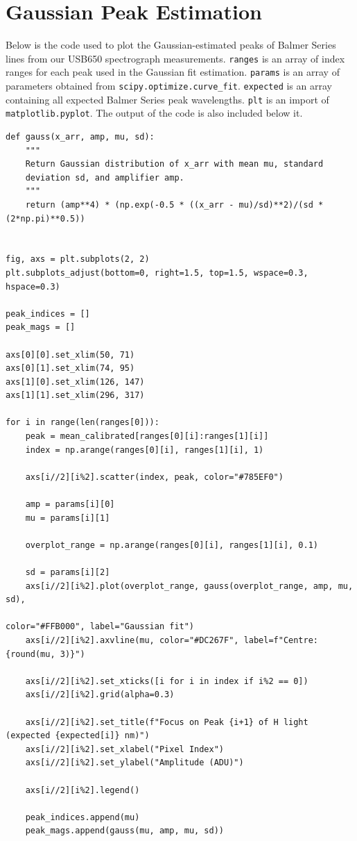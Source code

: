\documentclass[twocolumn]{aastex702}
\begin{document}
	\newpage
  \appendix
 		\section{Gaussian Peak Estimation}\label{code:gauss}
 		
 		Below is the code used to plot the Gaussian-estimated peaks of Balmer Series lines from our USB650 spectrograph measurements. \texttt{ranges} is an array of index ranges for each peak used in the Gaussian fit estimation. \texttt{params} is an array of parameters obtained from \texttt{scipy.optimize.curve\_fit}. \texttt{expected} is an array containing all expected Balmer Series peak wavelengths. \texttt{plt} is an import of \texttt{matplotlib.pyplot}. The output of the code is also included below it.
 		
	 		\begin{verbatim}
def gauss(x_arr, amp, mu, sd):
    """
    Return Gaussian distribution of x_arr with mean mu, standard 
    deviation sd, and amplifier amp.
    """
    return (amp**4) * (np.exp(-0.5 * ((x_arr - mu)/sd)**2)/(sd * (2*np.pi)**0.5))


fig, axs = plt.subplots(2, 2)
plt.subplots_adjust(bottom=0, right=1.5, top=1.5, wspace=0.3, hspace=0.3)

peak_indices = []
peak_mags = []

axs[0][0].set_xlim(50, 71)
axs[0][1].set_xlim(74, 95)
axs[1][0].set_xlim(126, 147)
axs[1][1].set_xlim(296, 317)

for i in range(len(ranges[0])):
    peak = mean_calibrated[ranges[0][i]:ranges[1][i]]
    index = np.arange(ranges[0][i], ranges[1][i], 1)
    
    axs[i//2][i%2].scatter(index, peak, color="#785EF0")
    
    amp = params[i][0]
    mu = params[i][1]    
    
    overplot_range = np.arange(ranges[0][i], ranges[1][i], 0.1)
        
    sd = params[i][2]
    axs[i//2][i%2].plot(overplot_range, gauss(overplot_range, amp, mu, sd), 
    																				color="#FFB000", label="Gaussian fit")
    axs[i//2][i%2].axvline(mu, color="#DC267F", label=f"Centre: {round(mu, 3)}")

    axs[i//2][i%2].set_xticks([i for i in index if i%2 == 0])
    axs[i//2][i%2].grid(alpha=0.3)

    axs[i//2][i%2].set_title(f"Focus on Peak {i+1} of H light (expected {expected[i]} nm)")
    axs[i//2][i%2].set_xlabel("Pixel Index")
    axs[i//2][i%2].set_ylabel("Amplitude (ADU)")

    axs[i//2][i%2].legend()

    peak_indices.append(mu)
    peak_mags.append(gauss(mu, amp, mu, sd))
	 		
	 		\end{verbatim}
	 		
\end{document}
